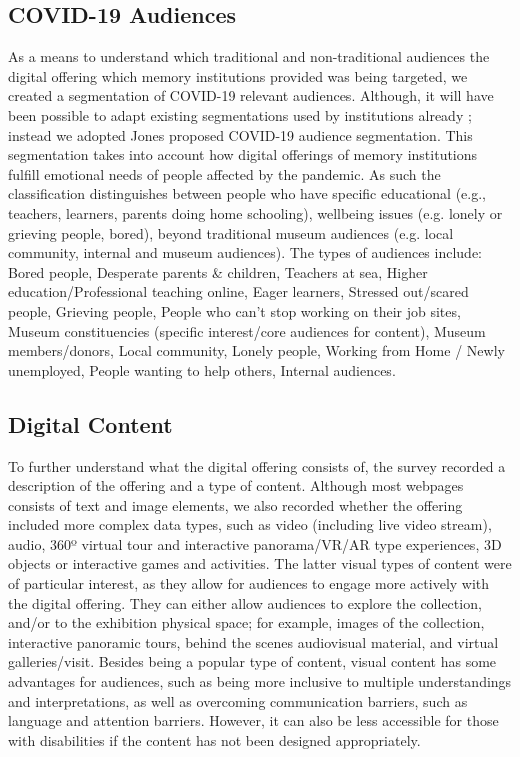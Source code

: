 \documentclass{egpubl}
\begin{document}
\subsection{COVID-19 Audiences}
As a means to understand which traditional and non-traditional audiences the digital offering which memory institutions provided was being targeted, we created a segmentation of COVID-19 relevant audiences. Although, it will have been possible to adapt existing segmentations used by institutions already \cite{Drot19}; instead we adopted Jones \cite{Audiences2020} proposed COVID-19 audience segmentation. This segmentation takes into account how digital offerings of memory institutions fulfill emotional needs of people affected by the pandemic. As such the classification distinguishes between people who have specific educational (e.g., teachers, learners, parents doing home schooling), wellbeing issues (e.g. lonely or grieving  people, bored), beyond traditional museum audiences (e.g. local community, internal and museum audiences). The types of audiences include: Bored people, Desperate parents \& children, Teachers at sea, Higher education/Professional teaching online, Eager learners, Stressed out/scared people, Grieving people, People who can’t stop working on their job sites, Museum constituencies (specific interest/core audiences for content), Museum members/donors, Local community, Lonely people, Working from Home / Newly unemployed, People wanting to help others, Internal audiences.

\subsection{Digital Content}
To further understand what the digital offering consists of, the survey recorded a description of the offering and a type of content. Although most webpages consists of text and image elements, we also recorded whether the offering included more complex data types, such as video (including live video stream), audio, 360º virtual tour and interactive panorama/VR/AR type experiences, 3D objects or interactive games and activities. The latter visual types of content were of particular interest, as they allow for audiences to engage more actively with the digital offering. They can either allow audiences to explore the collection, and/or to the exhibition physical space; for example, images of the collection, interactive panoramic tours,  behind the scenes audiovisual material, and virtual galleries/visit. Besides being a popular type of content, visual content has some advantages for audiences, such as being more inclusive to multiple understandings and interpretations, as well as overcoming communication barriers, such as language and attention barriers. However, it can also be less accessible for those with disabilities if the content has not been designed appropriately.
\end{document}
